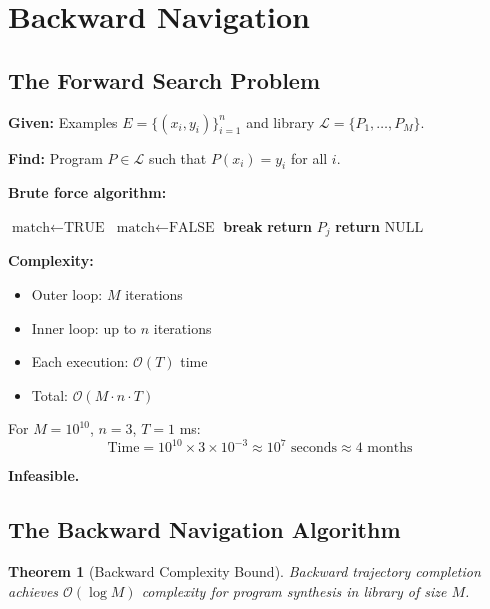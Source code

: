 \documentclass[twocolumn,10pt]{article}
\newtheorem{theorem}{Theorem}[section]
\theoremstyle{definition}
\theoremstyle{remark}
\newcommand{\bigO}{\mathcal{O}}
\begin{document}
\section{Backward Navigation}
\label{sec:backward_nav}

\subsection{The Forward Search Problem}

\textbf{Given:} Examples $E = \{(x_i, y_i)\}_{i=1}^n$ and library $\mathcal{L} = \{P_1, \ldots, P_M\}$.

\textbf{Find:} Program $P \in \mathcal{L}$ such that $P(x_i) = y_i$ for all $i$.

\vspace{0.2cm}
\noindent\textbf{Brute force algorithm:}
\begin{algorithm}
\caption{Forward Search}
\begin{algorithmic}[1]
  \STATE $\text{match} \leftarrow \text{TRUE}$
      \STATE $\text{match} \leftarrow \text{FALSE}$
      \STATE \textbf{break}
    \ENDIF
  \ENDFOR
    \STATE \textbf{return} $P_j$
  \ENDIF
\ENDFOR
\STATE \textbf{return} $\text{NULL}$
\end{algorithmic}
\end{algorithm}

\textbf{Complexity:}
\begin{itemize}
\item Outer loop: $M$ iterations
\item Inner loop: up to $n$ iterations
\item Each execution: $\bigO(T)$ time
\item Total: $\bigO(M \cdot n \cdot T)$
\end{itemize}

For $M = 10^{10}$, $n = 3$, $T = 1$ ms:
\begin{equation}
\text{Time} = 10^{10} \times 3 \times 10^{-3} \approx 10^7 \text{ seconds} \approx 4 \text{ months}
\end{equation}

\textbf{Infeasible.}

\subsection{The Backward Navigation Algorithm}

\begin{theorem}[Backward Complexity Bound]
\label{thm:backward_complexity}
Backward trajectory completion achieves $\bigO(\log M)$ complexity for program synthesis in library of size $M$.
\end{theorem}
\end{document}
